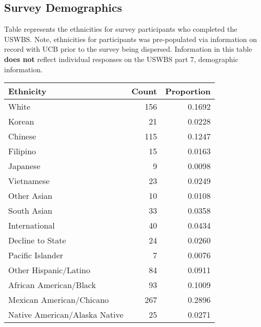 \documentclass{article}\usepackage[]{graphicx}\usepackage[]{color}
\begin{document}
\pagebreak

\subsection{Survey Demographics}
Table represents the ethnicities for survey participants who completed the USWBS. Note, ethnicities for participants was pre-populated via information on record with UCB prior to the survey being dispersed. Information in this table \textbf{does not} reflect individual responses on the USWBS part 7, demographic information.
\begin{table}[ht]
\centering
\begin{tabular}{lrr}
  \hline
Ethnicity & Count & Proportion \\ 
  \hline
                         White & 156 & 0.1692 \\ 
                          Korean & 21 & 0.0228 \\ 
                         Chinese & 115 & 0.1247 \\ 
                        Filipino & 15 & 0.0163 \\ 
                        Japanese & 9 & 0.0098 \\ 
                      Vietnamese & 23 & 0.0249 \\ 
                     Other Asian & 10 & 0.0108 \\ 
                     South Asian & 33 & 0.0358 \\ 
                   International & 40 & 0.0434 \\ 
                Decline to State & 24 & 0.0260 \\ 
                Pacific Islander & 7 & 0.0076 \\ 
           Other Hispanic/Latino & 84 & 0.0911 \\ 
          African American/Black & 93 & 0.1009 \\ 
        Mexican American/Chicano & 267 & 0.2896 \\ 
   Native American/Alaska Native & 25 & 0.0271 \\ 
   \hline
\end{tabular}
\end{table}
\end{document}
